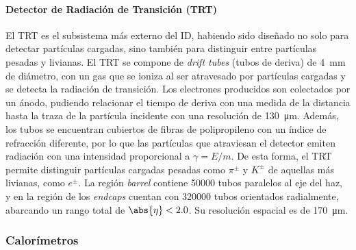 \paragraph{Detector de Radiación de Transición (TRT)}

El TRT es el subsistema más externo del ID, habiendo sido diseñado no solo para detectar partículas cargadas, sino también para distinguir entre partículas pesadas y livianas. El TRT se compone de \textit{drift tubes} (tubos de deriva) de \SI{4}{\milli\meter} de diámetro, con un gas que se ioniza al ser atravesado por partículas cargadas y se detecta la radiación de transición. Los electrones producidos son colectados por un ánodo, pudiendo relacionar el tiempo de deriva con una medida de la distancia hasta la traza de la partícula incidente con una resolución de \SI{130}{\micro\meter}. Además, los tubos se encuentran cubiertos de fibras de polipropileno con un índice de refracción diferente, por lo que las partículas que atraviesan el detector emiten radiación con una intensidad proporcional a $\gamma = E/m$. De esta forma, el TRT permite distinguir partículas cargadas pesadas como $\pi^\pm$ y $K^\pm$ de aquellas más livianas, como $e^\pm$. La región \textit{barrel} contiene 50000 tubos paralelos al eje del haz, y en la región de los \textit{endcaps} cuentan con 320000 tubos orientados radialmente, abarcando un rango total de $\abs{\eta} < 2.0$. Su resolución espacial es de \SI{170}{\micro\meter}.



\subsubsection{Calorímetros} \label{sec:ch2:atlas:calo}

